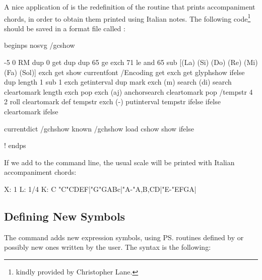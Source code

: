 \documentclass[a4paper,12pt]{book}
\begin{document}
A nice application of  is the redefinition of the
routine that prints accompaniment chords, in order to obtain them
printed using Italian notes. The following code\footnote{kindly
provided by Christopher Lane.} should be saved in a format file called
:

{\small
\begin{abcsource}

beginps nosvg
/gcshow { %
  -5 0 RM
  dup 0 get
  dup dup 65 ge exch 71 le and {
  65 sub [(La) (Si) (Do) (Re) (Mi) (Fa) (Sol)] exch get show
  } { currentfont /Encoding get exch get glyphshow
  } ifelse
  dup length 1 sub 1 exch getinterval
  dup mark exch (m) search {
    (di) search { cleartomark } {
      length exch pop exch (aj) anchorsearch { cleartomark } {
        pop /tempstr 4 2 roll cleartomark
        def tempstr exch (-) putinterval tempstr
      } ifelse
    } ifelse
  } {
  cleartomark } ifelse

  currentdict /gchshow known {
    /gchshow load cshow   %
  } {
    show                  %
  } ifelse
}!
endps

\end{abcsource}
}

If we add  to the command line, the usual scale will
be printed with Italian accompaniment chords:

{\small
\begin{abcsource}
X: 1
L: 1/4
K: C
"C"CDEF|"G"GABc|"A-"A,B,CD|"E-"EFGA|
\end{abcsource}
}



\subsection{Defining New Symbols}

The  command adds new expression symbols, using \ps{}
routines defined by \abcm{} or possibly new ones written by the user.
The syntax is the following:

\medskip

  
    
\end{document}
